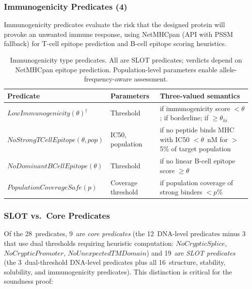 \subsubsection{Immunogenicity Predicates (4)}

Immunogenicity predicates evaluate the risk that the designed protein
will provoke an unwanted immune response, using NetMHCpan (API with
PSSM fallback) for T-cell epitope prediction and B-cell epitope
scoring heuristics.

\begin{table}[t]
\centering
\caption{Immunogenicity type predicates. All are SLOT predicates;
         verdicts depend on NetMHCpan epitope prediction.
         Population-level parameters enable allele-frequency-aware
         assessment.}
\label{tab:imm-predicates}
\begin{tabular}{llp{4.6cm}}
\toprule
\textbf{Predicate} & \textbf{Parameters} & \textbf{Three-valued semantics} \\
\midrule
$\mathit{LowImmunogenicity}(\theta)^\dagger$ & Threshold &
  \PASS{} if immunogenicity score $< \theta$; \UNCERTAIN{} if
  borderline; \FAIL{} if $\ge \theta_{\mathit{hi}}$ \\
$\mathit{NoStrongTCellEpitope}(\theta,\mathit{pop})$ & IC50, population &
  \PASS{} if no peptide binds MHC with IC50 $< \theta$~nM for
  $>$5\% of target population \\
$\mathit{NoDominantBCellEpitope}(\theta)$ & Threshold &
  \PASS{} if no linear B-cell epitope score $\ge \theta$ \\
$\mathit{PopulationCoverageSafe}(p)$ & Coverage threshold &
  \PASS{} if population coverage of strong binders $< p$\% \\
\bottomrule
\end{tabular}
\end{table}

\subsubsection{SLOT vs.\ Core Predicates}

Of the 28~predicates, 9~are \emph{core predicates} (the 12~DNA-level
predicates minus 3 that use dual thresholds requiring heuristic
computation: $\mathit{NoCrypticSplice}$, $\mathit{NoCrypticPromoter}$,
$\mathit{NoUnexpectedTMDomain}$) and 19~are \emph{SLOT predicates}
(the 3~dual-threshold DNA-level predicates plus all 16~structure,
stability, solubility, and immunogenicity predicates).
This distinction is critical for the soundness proof:

